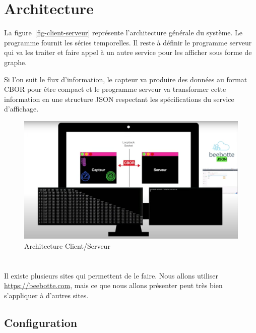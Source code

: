 \section{Architecture}

La figure~\vref{fig-client-serveur} représente l'architecture générale du système. Le programme  fournit les séries temporelles. Il reste à définir le programme serveur qui va les traiter et faire appel à un autre service pour les afficher sous forme de graphe. 

       \vspace{1em}


Si l'on suit le flux d'information, le capteur va produire des données au format CBOR pour être compact et le programme serveur va transformer cette information en une structure JSON respectant les spécifications du service d'affichage.

\begin{figure}[tbp]
\centerline{\includegraphics[width=1\columnwidth]{Pictures/Capture40.png}}
\caption{Architecture Client/Serveur}
\label{fig-client-serveur}
\end{figure}

\section{}

Il existe plusieurs sites qui permettent de le faire. Nous allons utiliser \url{https://beebotte.com}, mais ce que nous allons présenter peut très bien s'appliquer à d'autres sites.

\subsection{Configuration}


